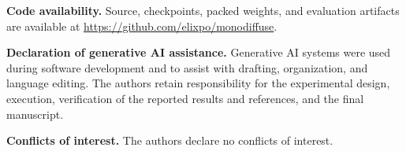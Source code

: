 \documentclass[conference]{IEEEtran}
\begin{document}
\smallskip\noindent\textbf{Code availability.}
Source, checkpoints, packed weights, and evaluation artifacts are available at
\url{https://github.com/elixpo/monodiffuse}.

\smallskip\noindent\textbf{Declaration of generative AI assistance.}
Generative AI systems were used during software development and to assist with
drafting, organization, and language editing. The authors retain responsibility
for the experimental design, execution, verification of the reported results
and references, and the final manuscript.

\smallskip\noindent\textbf{Conflicts of interest.}
The authors declare no conflicts of interest.



\end{document}

